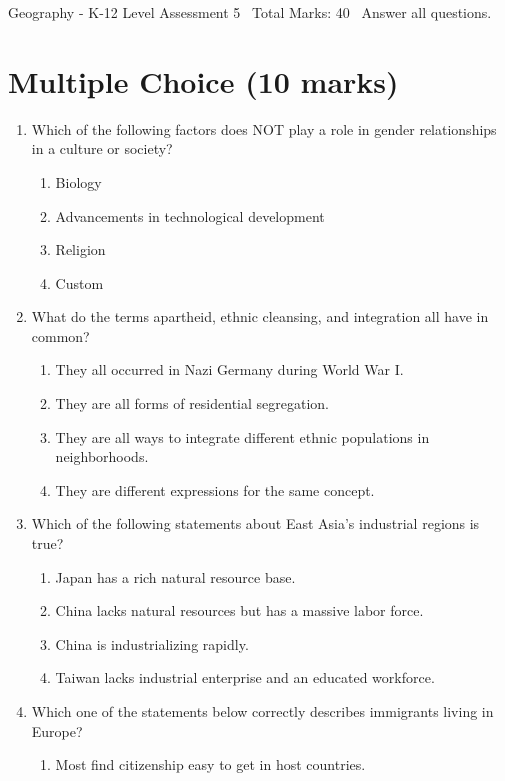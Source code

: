 \documentclass[12pt]{article}
\begin{document}
\begin{center}
Geography - K-12 Level Assessment 5 \
Total Marks: 40 \
Answer all questions.
\end{center}

\section*{Multiple Choice (10 marks)}
\begin{enumerate}[label=\arabic*.]
\item Which of the following factors does NOT play a role in gender relationships in a culture or society?
\begin{enumerate}[label=(\alph*)]
    \item Biology
    \item Advancements in technological development
    \item Religion
    \item Custom
\end{enumerate}
\item What do the terms apartheid, ethnic cleansing, and integration all have in common?
\begin{enumerate}[label=(\alph*)]
    \item They all occurred in Nazi Germany during World War I.
    \item They are all forms of residential segregation.
    \item They are all ways to integrate different ethnic populations in neighborhoods.
    \item They are different expressions for the same concept.
\end{enumerate}
\item Which of the following statements about East Asia's industrial regions is true?
\begin{enumerate}[label=(\alph*)]
    \item Japan has a rich natural resource base.
    \item China lacks natural resources but has a massive labor force.
    \item China is industrializing rapidly.
    \item Taiwan lacks industrial enterprise and an educated workforce.
\end{enumerate}
\item Which one of the statements below correctly describes immigrants living in Europe?
\begin{enumerate}[label=(\alph*)]
    \item Most find citizenship easy to get in host countries.

\end{enumerate}
\end{enumerate}
\end{document}
